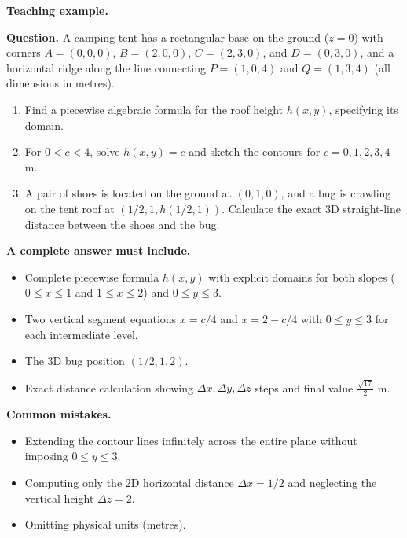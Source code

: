 \documentclass[11pt,letterpaper]{article}
\begin{document}
\textbf{Teaching example.}

\textbf{Question.} 
A camping tent has a rectangular base on the ground ($z=0$) with corners $A=(0,0,0)$, $B=(2,0,0)$, $C=(2,3,0)$, and $D=(0,3,0)$, and a horizontal ridge along the line connecting $P=(1,0,4)$ and $Q=(1,3,4)$ (all dimensions in metres).
\begin{enumerate}[label=(\alph*),nosep]
    \item Find a piecewise algebraic formula for the roof height $h(x,y)$, specifying its domain.
    \item For $0 < c < 4$, solve $h(x,y) = c$ and sketch the contours for $c = 0, 1, 2, 3, 4$ m.
    \item A pair of shoes is located on the ground at $(0,1,0)$, and a bug is crawling on the tent roof at $(1/2, 1, h(1/2,1))$. Calculate the exact 3D straight-line distance between the shoes and the bug.
\end{enumerate}

\textbf{A complete answer must include.}
\begin{itemize}[leftmargin=*,nosep]
    \item Complete piecewise formula $h(x,y)$ with explicit domains for both slopes ($0 \le x \le 1$ and $1 \le x \le 2$) and $0 \le y \le 3$.
    \item Two vertical segment equations $x = c/4$ and $x = 2 - c/4$ with $0 \le y \le 3$ for each intermediate level.
    \item The 3D bug position $(1/2, 1, 2)$.
    \item Exact distance calculation showing $\Delta x, \Delta y, \Delta z$ steps and final value $\frac{\sqrt{17}}{2}$ m.
\end{itemize}

\textbf{Common mistakes.}
\begin{itemize}[leftmargin=*,nosep]
    \item Extending the contour lines infinitely across the entire plane without imposing $0 \le y \le 3$.
    \item Computing only the 2D horizontal distance $\Delta x = 1/2$ and neglecting the vertical height $\Delta z = 2$.
    \item Omitting physical units (metres).
\end{itemize}

\clearpage

\end{document}
